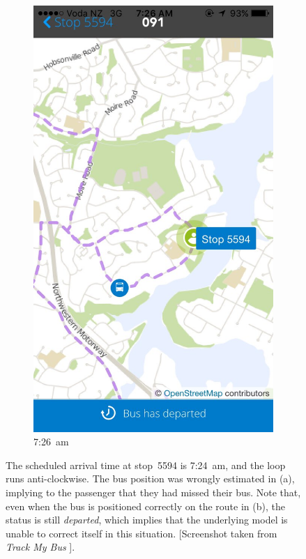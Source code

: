 \documentclass[12pt,a4paper]{article}
\begin{document}
\begin{figure}[!b]
\begin{subfigure}{0.4\textwidth}
    \includegraphics[width=\textwidth,trim={0 0 0 15cm},clip]{bus-loop-durp2.jpg}
    \caption{7:26~am}
    \label{fig:colwill-loop-2}
  \end{subfigure}
  \caption{%
    The scheduled arrival time at stop~5594 is 7:24~am,
    and the loop runs anti-clockwise.
    The bus position was wrongly estimated in (a),
    implying to the passenger that they had missed their bus.
    Note that, even when the bus is positioned correctly on the route in (b),
    the status is still \emph{departed},
    which implies that the underlying model is unable to correct itself in this situation.\newline
    \footnotesize{[Screenshot taken from \emph{Track My Bus} \citep{trackmybus}].}}
  \label{fig:colwill-loop}
\end{figure}
\end{document}
